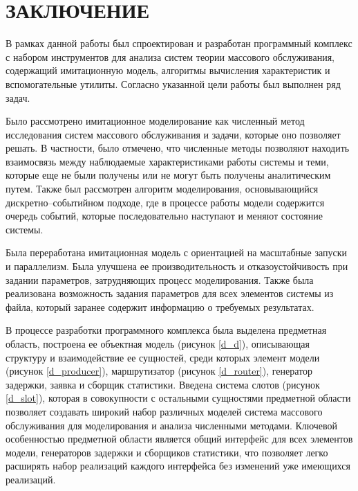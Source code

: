 \section*{\centering\normalsize ЗАКЛЮЧЕНИЕ}

В рамках данной работы был спроектирован и разработан программный комплекс с набором инструментов для анализа систем теории массового обслуживания, содержащий имитационную модель, алгоритмы вычисления характеристик и вспомогательные утилиты. Согласно указанной цели работы был выполнен ряд задач.

Было рассмотрено имитационное моделирование как численный метод исследования систем массового обслуживания и задачи, которые оно позволяет решать. В частности, было отмечено, что численные методы позволяют находить взаимосвязь между наблюдаемые характеристиками работы системы и теми, которые еще не были получены или не могут быть получены аналитическим путем. Также был рассмотрен алгоритм моделирования, основывающийся дискретно--событийном подходе, где в процессе работы модели содержится очередь событий, которые последовательно наступают и меняют состояние системы. 

Была переработана имитационная модель с ориентацией на масштабные запуски и параллелизм. Была улучшена ее производительность и отказоустойчивость при задании параметров, затрудняющих процесс моделирования. Также была реализована возможность задания параметров для всех элементов системы из файла, который заранее содержит информацию о требуемых результатах.

В процессе разработки программного комплекса была выделена предметная область, построена ее объектная модель (рисунок  \ref{d_d}), описывающая структуру и взаимодействие ее сущностей, среди которых элемент модели (рисунок \ref{d_producer}), маршрутизатор (рисунок \ref{d_router}), генератор задержки, заявка и сборщик статистики. Введена система слотов (рисунок \ref{d_slot}), которая в совокупности с остальными сущностями предметной области позволяет создавать широкий набор различных моделей система массового обслуживания для моделирования и анализа численными методами. Ключевой особенностью предметной области является общий интерфейс для всех элементов модели, генераторов задержки и сборщиков статистики, что позволяет легко расширять набор реализаций каждого интерфейса без изменений уже имеющихся реализаций.

